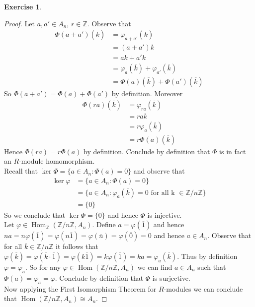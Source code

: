 \documentclass[8pt]{amsart}
\theoremstyle{plain}%
\theoremstyle{definition}
\newtheorem*{exercise}{Exercise}%
\theoremstyle{remark}
\numberwithin{equation}{section}
\newcommand{\Z}{\mathbb{Z}}
\begin{document}
\begin{exercise}
\begin{proof}
		Let $a, a' \in A_n$, $r \in \Z$. Observe that
		\begin{align*}
			\Phi(a + a')(\overline k)&= \varphi_{a + a'}(\overline k)\\
			&= (a + a')k\\
			&= ak + a'k\\
			&= \varphi_a(\overline k) + \varphi_{a'}(\overline k)\\
			&= \Phi(a)(\overline k) + \Phi(a')(\overline k)
		\end{align*}
		So $\Phi(a + a') = \Phi(a) + \Phi(a')$ by definition. Moreover
		\begin{align*}
			\Phi(ra)(\overline k) &= \varphi_{ra}(\overline k)\\
			&= rak\\
			&= r\varphi_{a}(\overline k)\\
			&= r\Phi(a)(\overline k)
		\end{align*}
		Hence $\Phi(ra) = r\Phi(a)$ by definition. Conclude by definition that $\Phi$ is in fact an $R$-module homomorphism.\\

		Recall that $\ker \Phi = \{a \in A_n : \Phi(a) = 0\}$ and observe that
		\begin{align*}
			\ker \varphi &= \{a \in A_n : \Phi(a) = 0\}\\
			&= \{a \in A_n : \varphi_a(\overline k) = 0 \text{ for all k } \in \Z/n\Z\}\\
			&= \{0\}
		\end{align*}
		So we conclude that $\ker \Phi = \{0\}$ and hence $\Phi$ is injective.\\

		Let $\varphi \in \operatorname{Hom}_\Z(\Z/n\Z, A_n)$. Define $a = \varphi(\overline 1)$ and hence $na = n\varphi(\overline 1) = \varphi(n \overline 1) = \varphi(\overline n) = \varphi(\overline 0) = 0$ and hence $a \in A_n$. Observe that for all $\overline k \in \Z/n\Z$ it follows that $\varphi(\overline k) = \varphi(\overline k \cdot \overline 1) = \varphi(k \overline 1) = k \varphi(\overline 1) = ka = \varphi_a(\overline k)$. Thus by definition $\varphi = \varphi_a$. So for any $\varphi \in \operatorname{Hom}(\Z/n\Z, A_n)$ we can find $a \in A_n$ such that $\Phi(a) = \varphi_a = \varphi$. Conclude by definition that $\Phi$ is surjective.\\

		Now applying the First Isomorphism Theorem for $R$-modules we can conclude that $\operatorname{Hom}(\Z/n\Z, A_n) \cong A_n$.
	\end{proof}
\end{exercise}
\end{document}
